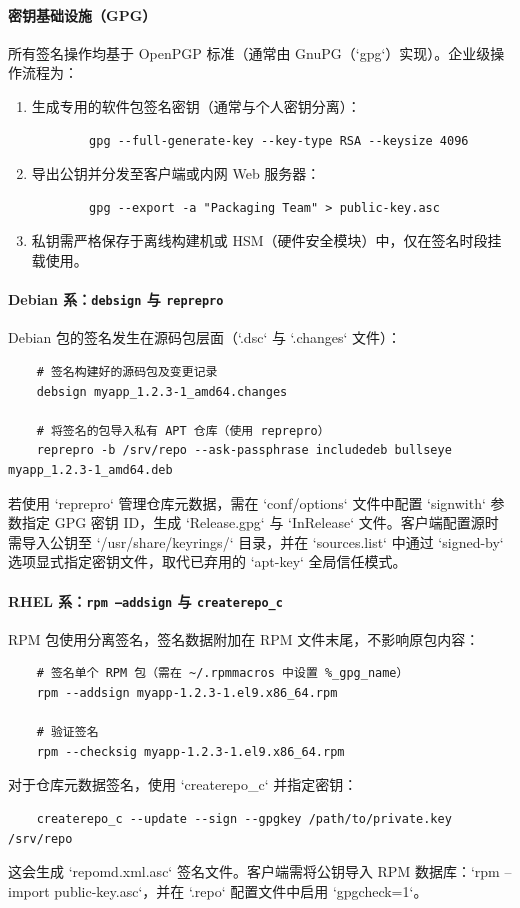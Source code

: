 \documentclass[12pt,UTF8]{ctexbook}
\begin{document}
\paragraph{密钥基础设施（GPG）}
所有签名操作均基于 OpenPGP 标准（通常由 GnuPG（`gpg`）实现）。企业级操作流程为：
\begin{enumerate}
	\item 生成专用的软件包签名密钥（通常与个人密钥分离）：
	\begin{verbatim}
		gpg --full-generate-key --key-type RSA --keysize 4096
	\end{verbatim}
	\item 导出公钥并分发至客户端或内网 Web 服务器：
	\begin{verbatim}
		gpg --export -a "Packaging Team" > public-key.asc
	\end{verbatim}
	\item 私钥需严格保存于离线构建机或 HSM（硬件安全模块）中，仅在签名时段挂载使用。
\end{enumerate}

\paragraph{Debian 系：\texttt{debsign} 与 \texttt{reprepro}}
Debian 包的签名发生在源码包层面（`.dsc` 与 `.changes` 文件）：
\begin{verbatim}
	# 签名构建好的源码包及变更记录
	debsign myapp_1.2.3-1_amd64.changes
	
	# 将签名的包导入私有 APT 仓库（使用 reprepro）
	reprepro -b /srv/repo --ask-passphrase includedeb bullseye myapp_1.2.3-1_amd64.deb
\end{verbatim}
若使用 `reprepro` 管理仓库元数据，需在 `conf/options` 文件中配置 `signwith` 参数指定 GPG 密钥 ID，生成 `Release.gpg` 与 `InRelease` 文件。客户端配置源时需导入公钥至 `/usr/share/keyrings/` 目录，并在 `sources.list` 中通过 `signed-by` 选项显式指定密钥文件，取代已弃用的 `apt-key` 全局信任模式。

\paragraph{RHEL 系：\texttt{rpm --addsign} 与 \texttt{createrepo\_c}}
RPM 包使用分离签名，签名数据附加在 RPM 文件末尾，不影响原包内容：
\begin{verbatim}
	# 签名单个 RPM 包（需在 ~/.rpmmacros 中设置 %_gpg_name）
	rpm --addsign myapp-1.2.3-1.el9.x86_64.rpm
	
	# 验证签名
	rpm --checksig myapp-1.2.3-1.el9.x86_64.rpm
\end{verbatim}
对于仓库元数据签名，使用 `createrepo\_c` 并指定密钥：
\begin{verbatim}
	createrepo_c --update --sign --gpgkey /path/to/private.key /srv/repo
\end{verbatim}
这会生成 `repomd.xml.asc` 签名文件。客户端需将公钥导入 RPM 数据库：`rpm --import public-key.asc`，并在 `.repo` 配置文件中启用 `gpgcheck=1`。
\end{document}
